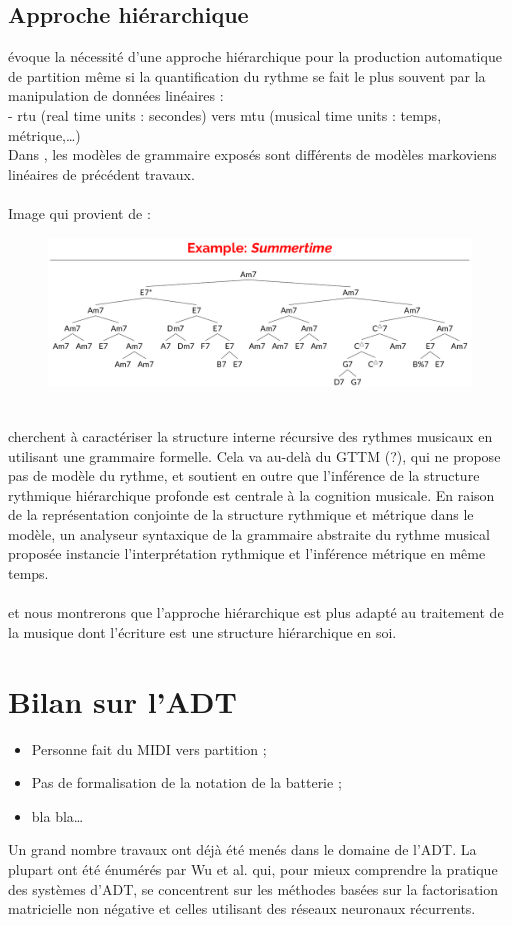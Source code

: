 \subsection*{Approche hiérarchique}
\cite{foscarin:hal-01988990} évoque la nécessité d’une approche hiérarchique pour la production automatique de partition même si la quantification du rythme se fait le plus souvent par la manipulation de données linéaires :\\
- rtu (real time units : secondes) vers mtu (musical time units : temps, métrique,…)\\
Dans \cite{foscarin:hal-01988990}, les modèles de grammaire exposés sont différents de modèles markoviens linéaires de précédent travaux.\\\\
Image qui provient de \cite{harasimjazz} :\\
\begin{figure}[h]
	\centering
	\includegraphics[height=40mm, width=120mm]{z_images/2_etat_de_l_art/summertime_tree.png}
\end{figure}\\

\cite{rohrmeier2020towards} cherchent à caractériser la structure interne récursive des rythmes musicaux en utilisant une grammaire formelle.
Cela va au-delà du GTTM (?), qui ne propose pas de modèle du rythme, et soutient en outre que l'inférence de la structure rythmique hiérarchique profonde est centrale à la cognition musicale. En raison de la représentation conjointe de la structure rythmique et métrique dans le modèle, un analyseur syntaxique de la grammaire abstraite du rythme musical proposée instancie l'interprétation rythmique et l'inférence métrique en même temps.\\\\
et nous montrerons que l’approche hiérarchique est plus adapté au traitement de la musique dont l’écriture est une structure hiérarchique en soi.
\section{Bilan sur l’ADT}
\begin{itemize}
	\item Personne fait du MIDI vers partition ;
	\item Pas de formalisation de la notation de la batterie ;
	\item bla bla…
\end{itemize}
Un grand nombre travaux ont déjà été menés dans le domaine de l’ADT. La plupart ont été énumérés par Wu et al. \cite{Review_ADT} qui, pour mieux comprendre la pratique des systèmes d’ADT, se concentrent sur les méthodes basées sur la factorisation matricielle non négative et celles utilisant des réseaux neuronaux récurrents.\\
